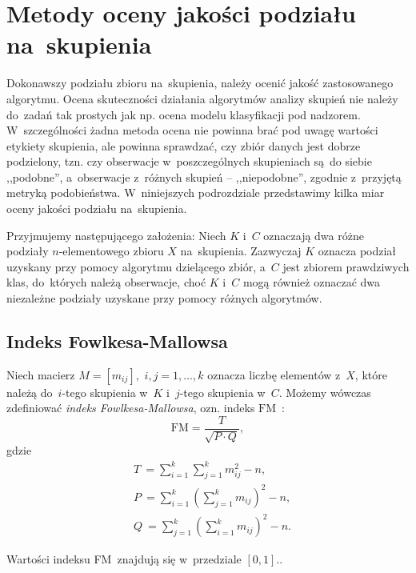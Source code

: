 \documentclass{praca1}
\begin{document}
\section{Metody oceny jakości podziału na~skupienia}	

Dokonawszy podziału zbioru na~skupienia, należy ocenić jakość zastosowanego algorytmu. Ocena skuteczności działania algorytmów analizy skupień nie należy do~zadań tak prostych jak np. ocena modelu klasyfikacji pod nadzorem. W~szczególności żadna metoda ocena nie powinna brać pod uwagę wartości etykiety skupienia, ale powinna sprawdzać, czy zbiór danych jest dobrze podzielony, tzn. czy obserwacje w~poszczególnych skupieniach są~do siebie ,,podobne'', a~obserwacje z~różnych skupień -- ,,niepodobne'', zgodnie z~przyjętą metryką podobieństwa. W~niniejszych podrozdziale przedstawimy kilka miar oceny jakości podziału na~skupienia.

Przyjmujemy następującego założenia: Niech $K$ i~$C$ oznaczają dwa różne podziały $n$-elementowego zbioru $X$ na~skupienia. Zazwyczaj $K$ oznacza podział uzyskany przy pomocy algorytmu dzielącego zbiór, a~$C$ jest zbiorem prawdziwych klas, do~których należą obserwacje, choć $K$ i~$C$ mogą również oznaczać dwa niezależne podziały uzyskane przy pomocy różnych algorytmów.

\subsection{Indeks Fowlkesa-Mallowsa}

\begin{definition}
Niech macierz $M = [m_{ij}],$ $i,j = 1,\ldots, k$ oznacza liczbę elementów z~$X$, które należą do~$i$-tego skupienia w~$K$ i~$j$-tego skupienia w~$C$. Możemy wówczas zdefiniować \emph{indeks Fowlkesa-Mallowsa}, ozn. indeks $\mathrm{FM}$~\cite{Fowlkes1983:fmindex}:
\begin{equation}
\mathrm{FM} = \frac{T}{\sqrt{P\cdot Q}},
\end{equation}
gdzie 
\begin{align*}
& T~= \sum\limits_{i=1}^{k}\sum\limits_{j=1}^{k} m_{ij}^2 - n,\\
& P~= \sum\limits_{i=1}^{k} (\sum\limits_{j=1}^{k} m_{ij})^2 - n,\\
& Q~= \sum\limits_{j=1}^{k} (\sum\limits_{i=1}^{k} m_{ij})^2 - n.
\end{align*}
\end{definition}

Wartości indeksu FM~znajdują się w~przedziale $[0,1]$..
\end{document}
